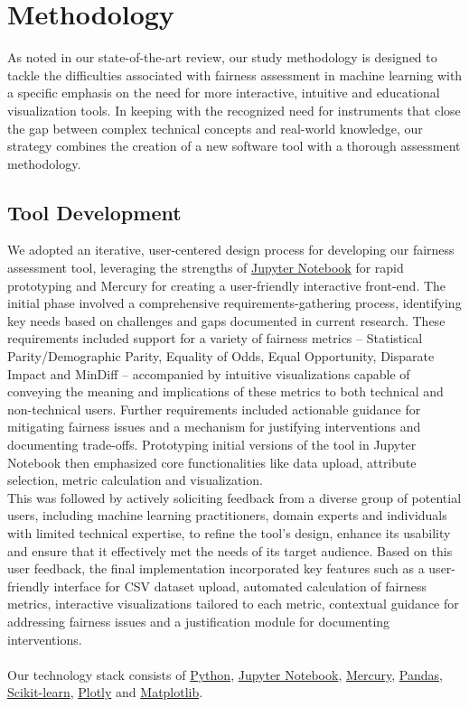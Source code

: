 \documentclass[runningheads]{llncs}
\begin{document}
\section{Methodology}
As noted in our state-of-the-art review, our study methodology is designed to tackle the difficulties associated with fairness assessment in machine learning with a specific emphasis on the need for more interactive, intuitive and educational visualization tools. In keeping with the recognized need for instruments that close the gap between complex technical concepts and real-world knowledge, our strategy combines the creation of a new software tool with a thorough assessment methodology.

\subsection{Tool Development}
We adopted an iterative, user-centered design process for developing our fairness assessment tool, leveraging the strengths of \href{https://jupyter.org}{Jupyter Notebook} for rapid prototyping and Mercury for creating a user-friendly interactive front-end. The initial phase involved a comprehensive requirements-gathering process, identifying key needs based on challenges and gaps documented in current research. These requirements included support for a variety of fairness metrics – Statistical Parity/Demographic Parity, Equality of Odds, Equal Opportunity, Disparate Impact and MinDiff – accompanied by intuitive visualizations capable of conveying the meaning and implications of these metrics to both technical and non-technical users. Further requirements included actionable guidance for mitigating fairness issues and a mechanism for justifying interventions and documenting trade-offs. Prototyping initial versions of the tool in Jupyter Notebook then emphasized core functionalities like data upload, attribute selection, metric calculation and visualization.\\

This was followed by actively soliciting feedback from a diverse group of potential users, including machine learning practitioners, domain experts and individuals with limited technical expertise, to refine the tool's design, enhance its usability and ensure that it effectively met the needs of its target audience. Based on this user feedback, the final implementation incorporated key features such as a user-friendly interface for CSV dataset upload, automated calculation of fairness metrics, interactive visualizations tailored to each metric, contextual guidance for addressing fairness issues and a justification module for documenting interventions.\\\\ Our technology stack consists of  \href{https://www.python.org}{Python}, \href{https://jupyter.org}{Jupyter Notebook}, \href{https://runmercury.com}{Mercury}, \href{https://pandas.pydata.org}{Pandas}, \href{https://scikit-learn.org/stable}{Scikit-learn}, \href{https://plotly.com/python}{Plotly} and \href{https://matplotlib.org}{Matplotlib}.
\end{document}
